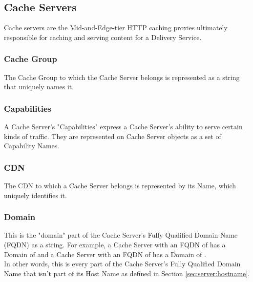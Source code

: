 %
%

\subsection{Cache Servers}
Cache servers are the Mid-and-Edge-tier HTTP caching proxies ultimately
responsible for caching and serving content for a Delivery Service.

\subsubsection{Cache Group}
The Cache Group to which the Cache Server belongs is represented as a string
that uniquely names it.

\subsubsection{Capabilities}
A Cache Server's "Capabilities" express a Cache Server's ability to serve
certain kinds of traffic. They are represented on Cache Server objects as a set
of Capability Names.

\subsubsection{CDN}
The CDN to which a Cache Server belongs is represented by its Name, which
uniquely identifies it.

\subsubsection{Domain\label{sec:server:domain}}
This is the "domain" part of the Cache Server's Fully Qualified Domain Name
(FQDN) as a string. For example, a Cache Server with an FQDN of
 has a Domain of  and a Cache Server with an FQDN of
 has a Domain of .\\
In other words, this is every part of the Cache Server's Fully Qualified Domain
Name that isn't part of its Host Name as defined in Section
\ref{sec:server:hostname}.

